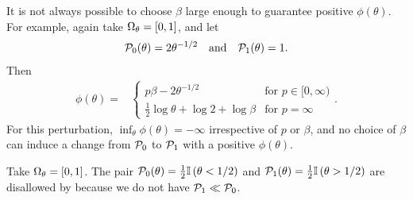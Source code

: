 \begin{ex}
%
It is not always possible to choose $\beta$ large enough to guarantee positive
$\phi(\theta)$. For example, again take $\Omega_{\theta}=[0,1]$, and let
%
\begin{align*}
%
\pbase(\theta) ={} 2 \theta^{-1/2} \mathand
\palt(\theta) ={} 1.
%
\end{align*}
%
Then
%
\begin{align*}
%
\phi(\theta) ={}&
\begin{cases}
        p\beta - 2 \theta^{-1/2} & \textrm{for }p \in [0, \infty) \\
        \frac{1}{2} \log \theta + \log 2 + \log \beta
            & \textrm{for }p = \infty
\end{cases}.
%
\end{align*}
%
For this perturbation, $\inf_\theta \phi(\theta) = -\infty$ irrespective
of $p$ or $\beta$, and no choice of $\beta$ can induce a change from
$\mathcal{P}_{0}$ to $\mathcal{P}_{1}$ with a positive $\phi(\theta)$.
%
\end{ex}

\begin{ex}
%
Take $\Omega_{\theta} = [0,1]$.  The pair $\mathcal{P}_{0}(\theta)  = \frac{1}{2}\mathbb{I}\left(\theta <
1/2\right)$ and $\mathcal{P}_{1}(\theta) = \frac{1}{2} \mathbb{I}\left(\theta > 1/2\right)$ are disallowed by
 because we do not have $\mathcal{P}_{1} \ll \mathcal{P}_{0}$.
%
\end{ex}


